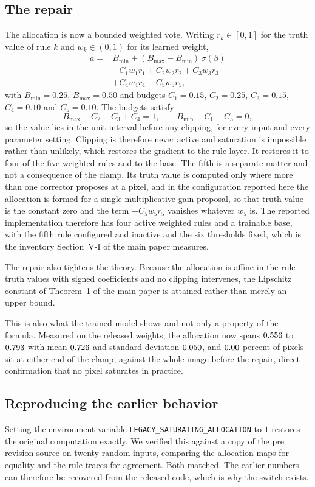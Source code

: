 \subsection{The repair}
The allocation is now a bounded weighted vote. Writing $r_k \in [0,1]$ for the truth value of rule
$k$ and $w_k \in (0,1)$ for its learned weight,
\begin{equation}
\begin{split}
a = {}& B_{\min} + (B_{\max}-B_{\min})\,\sigma(\beta) \\
     & - C_1 w_1 r_1 + C_2 w_2 r_2 + C_3 w_3 r_3 \\
     & + C_4 w_4 r_4 - C_5 w_5 r_5 ,
\end{split}
\end{equation}
with $B_{\min} = 0.25$, $B_{\max} = 0.50$ and budgets $C_1 = 0.15$, $C_2 = 0.25$, $C_3 = 0.15$,
$C_4 = 0.10$ and $C_5 = 0.10$. The budgets satisfy
\begin{equation}
B_{\max} + C_2 + C_3 + C_4 = 1, \qquad B_{\min} - C_1 - C_5 = 0 ,
\end{equation}
so the value lies in the unit interval before any clipping, for every input and every parameter
setting. Clipping is therefore never active and saturation is impossible rather than unlikely, which
restores the gradient to the rule layer. It restores it to four of the five weighted rules and to the
base. The fifth is a separate matter and not a consequence of the clamp. Its truth value is computed
only where more than one corrector proposes at a pixel, and in the configuration reported here the
allocation is formed for a single multiplicative gain proposal, so that truth value is the constant
zero and the term $-C_5 w_5 r_5$ vanishes whatever $w_5$ is. The reported implementation therefore
has four active weighted rules and a trainable base, with the fifth rule configured and inactive and
the six thresholds fixed, which is the inventory Section~V-I of the main paper measures.

The repair also tightens the theory. Because the allocation is affine in the rule truth values with
signed coefficients and no clipping intervenes, the Lipschitz constant of Theorem~1 of the main paper
is attained rather than merely an upper bound.

This is also what the trained model shows and not only a property of the formula. Measured on the
released weights, the allocation now spans $0.556$ to $0.793$ with mean $0.726$ and
standard deviation $0.050$, and $0.00$ percent of pixels sit at either end of the clamp,
against the whole image before the repair, direct confirmation that no pixel saturates in practice.

\subsection{Reproducing the earlier behavior}
Setting the environment variable \texttt{LEGACY\_SATURATING\_ALLOCATION} to $1$ restores the original
computation exactly. We verified this against a copy of the pre revision source on twenty random
inputs, comparing the allocation maps for equality and the rule traces for agreement. Both matched.
The earlier numbers can therefore be recovered from the released code, which is why the switch exists.
